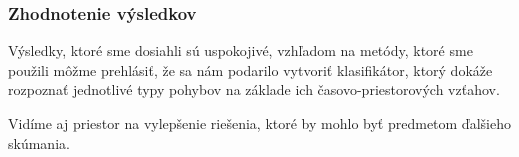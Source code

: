 \subsubsection{Zhodnotenie výsledkov}
Výsledky, ktoré sme dosiahli sú uspokojivé, vzhľadom na metódy, ktoré sme použili môžme prehlásiť, že sa nám podarilo vytvoriť klasifikátor, ktorý dokáže rozpoznať jednotlivé typy pohybov na základe ich časovo-priestorových vzťahov.

Vidíme aj priestor na vylepšenie riešenia, ktoré by mohlo byť predmetom ďalšieho skúmania. 


 









